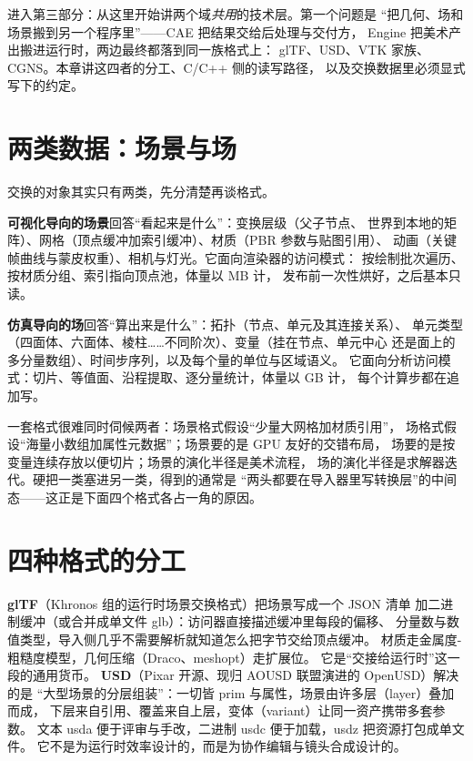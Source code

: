 \documentclass[12pt,a4paper,fontset=fandol]{ctexbook}
\newcommand{\Bk}{\discretionary{}{}{}}
\newcommand{\Lang}[1]{\textsf{#1}}
\newcommand{\CL}{\Lang{C}}
\newcommand{\CPP}{\Lang{C++}}
\newcommand{\DomCAE}{\Lang{CAE}}
\newcommand{\DomEngine}{\Lang{Engine}}
\begin{document}
进入第三部分：从这里开始讲两个域\emph{共用}的技术层。第一个问题是
``把几何、场和场景搬到另一个程序里''——\DomCAE{} 把结果交给后处理与交付方，
\DomEngine{} 把美术产出搬进运行时，两边最终都落到同一族格式上：
glTF、USD、VTK 家族、CGNS。本章讲这四者的分工、\CL/{\Bk}\CPP{} 侧的读写路径，
以及交换数据里必须显式写下的约定。

\section{两类数据：场景与场}
\label{sec:ch16-two-kinds}

交换的对象其实只有两类，先分清楚再谈格式。

\textbf{可视化导向的场景}回答``看起来是什么''：变换层级（父子节点、
世界到本地的矩阵）、网格（顶点缓冲加索引缓冲）、材质（PBR 参数与贴图引用）、
动画（关键帧曲线与蒙皮权重）、相机与灯光。它面向渲染器的访问模式：
按绘制批次遍历、按材质分组、索引指向顶点池，体量以 MB 计，
发布前一次性烘好，之后基本只读。

\textbf{仿真导向的场}回答``算出来是什么''：拓扑（节点、单元及其连接关系）、
单元类型（四面体、六面体、棱柱……不同阶次）、变量（挂在节点、单元中心
还是面上的多分量数组）、时间步序列，以及每个量的单位与区域语义。
它面向分析访问模式：切片、等值面、沿程提取、逐分量统计，体量以 GB 计，
每个计算步都在追加写。

一套格式很难同时伺候两者：场景格式假设``少量大网格加材质引用''，
场格式假设``海量小数组加属性元数据''；场景要的是 GPU 友好的交错布局，
场要的是按变量连续存放以便切片；场景的演化半径是美术流程，
场的演化半径是求解器迭代。硬把一类塞进另一类，得到的通常是
``两头都要在导入器里写转换层''的中间态——这正是下面四个格式各占一角的原因。

\section{四种格式的分工}
\label{sec:ch16-formats}

\textbf{glTF}（Khronos 组的运行时场景交换格式）把场景写成一个 JSON 清单
加二进制缓冲（或合并成单文件 glb）：访问器直接描述缓冲里每段的偏移、
分量数与数值类型，导入侧几乎不需要解析就知道怎么把字节交给顶点缓冲。
材质走金属度-粗糙度模型，几何压缩（Draco、meshopt）走扩展位。
它是``交接给运行时''这一段的通用货币。
\textbf{USD}（Pixar 开源、现归 AOUSD 联盟演进的 OpenUSD）解决的是
``大型场景的分层组装''：一切皆 prim 与属性，场景由许多层（layer）叠加而成，
下层来自引用、覆盖来自上层，变体（variant）让同一资产携带多套参数。
文本 usda 便于评审与手改，二进制 usdc 便于加载，usdz 把资源打包成单文件。
它不是为运行时效率设计的，而是为协作编辑与镜头合成设计的。
\end{document}
